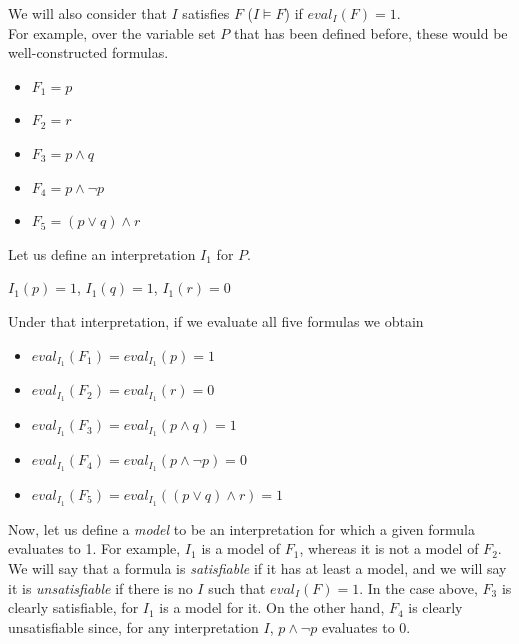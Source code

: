 We will also consider that $I$ satisfies $F$ ($I \models F$) if $eval_{I}(F) = 1$. \\

For example, over the variable set $P$ that has been defined before, these would be well-constructed formulas.

\begin{itemize}
  \item $F_{1} = p$
  \item $F_{2} = r$
  \item $F_{3} = p \wedge q$
  \item $F_{4} = p \wedge \neg p$
  \item $F_{5} = (p \lor q) \wedge r$
\end{itemize}

Let us define an interpretation $I_{1}$ for $P$. \\

\begin{center}$I_{1}(p) = 1$, $I_{1}(q) = 1$, $I_{1}(r) = 0$\end{center} 

Under that interpretation, if we evaluate all five formulas we obtain

\begin{itemize}
  \item $eval_{{I}_{1}}(F_{1}) = eval_{{I}_{1}}(p) = 1$
  \item $eval_{{I}_{1}}(F_{2}) = eval_{{I}_{1}}(r) = 0$
  \item $eval_{{I}_{1}}(F_{3}) = eval_{{I}_{1}}(p \wedge q) = 1$
  \item $eval_{{I}_{1}}(F_{4}) = eval_{{I}_{1}}(p \wedge \neg p) = 0$
  \item $eval_{{I}_{1}}(F_{5}) = eval_{{I}_{1}}((p \lor q) \wedge r) = 1$

\end{itemize}

Now, let us define a \textit{model} to be an interpretation for which a given formula evaluates to 1. For example, $I_{1}$ is a model of $F_{1}$, whereas it is not a model of $F_{2}$. We will say that a formula is \textit{satisfiable} if it has at least a model, and we will say it is \textit{unsatisfiable} if there is no $I$ such that $eval_{I}(F) = 1$. In the case above, $F_3$ is clearly satisfiable, for $I_{1}$ is a model for it. On the other hand, $F_{4}$ is clearly unsatisfiable since, for any interpretation $I$, $p \wedge \neg p$ evaluates to 0. \\

